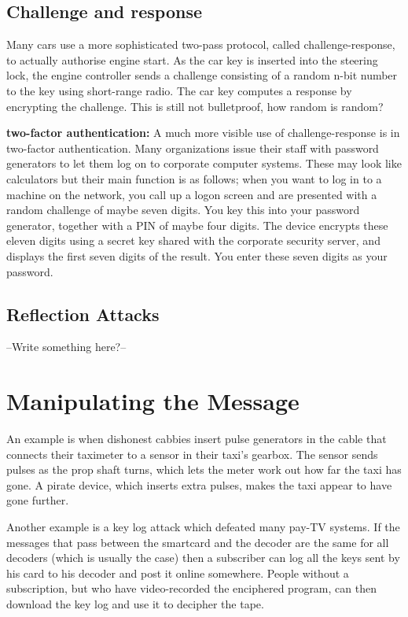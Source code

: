 	\clearpage
	\subsection{Challenge and response}

		Many cars use a more sophisticated two-pass protocol, called challenge-response, 
		to actually authorise engine start. As the car key is inserted into the steering lock, 
		the engine controller sends a challenge consisting of a random n-bit number to the key 
		using short-range radio. The car key computes a response by encrypting the challenge. 
		This is still not bulletproof, how random is random?

		{\bf two-factor authentication:} A much more visible use of challenge-response is in two-factor authentication.
		Many organizations issue their staff with password generators to let them
		log on to corporate computer systems. These may look like calculators
		but their main function is as follows; when you want to log in to a machine on the network, 
		you call up a logon screen and are presented with a random challenge of maybe seven digits. 
		You key this into your password generator, together with a PIN of maybe four
		digits. The device encrypts these eleven digits using a secret key shared with
		the corporate security server, and displays the first seven digits of the result.
		You enter these seven digits as your password.

	\subsection{Reflection Attacks}
		--Write something here?--

\clearpage
\section{Manipulating the Message}

	An example is when dishonest cabbies insert pulse generators in the cable
	that connects their taximeter to a sensor in their taxi’s gearbox. The sensor
	sends pulses as the prop shaft turns, which lets the meter work out how far
	the taxi has gone. A pirate device, which inserts extra pulses, makes the taxi
	appear to have gone further. 

	Another example is a key log attack which defeated many pay-TV systems. 
	If the messages that pass between the smartcard and the decoder are the same for
	all decoders (which is usually the case) then a subscriber can log all the keys
	sent by his card to his decoder and post it online somewhere. People without a
	subscription, but who have video-recorded the enciphered program, can then
	download the key log and use it to decipher the tape.

